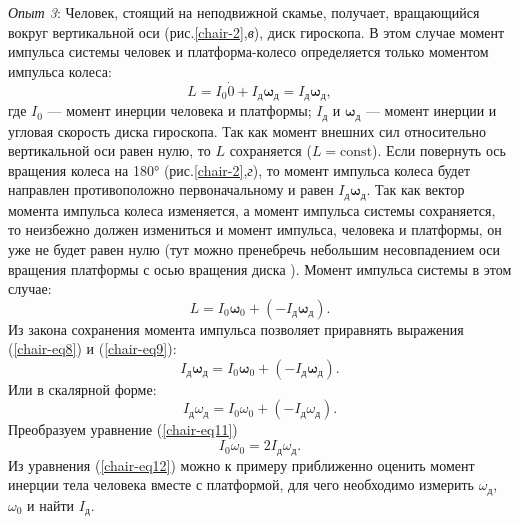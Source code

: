 \documentclass[All.tex]{subfiles}
\begin{document}
\textit{Опыт 3}:
Человек, стоящий на неподвижной скамье, получает, вращающийся вокруг вертикальной оси (рис.\ref{chair-2},\textit{в}), диск гироскопа. 
В этом случае момент импульса системы человек и платформа-колесо определяется только моментом импульса колеса:
\begin{equation}\label{chair-eq8}
L = I_{0} \dot 0 + I_{\text{д}}\bm{\omega}_{\text{д}} = I_{\text{д}}\bm{\omega}_{\text{д}},
\end{equation}
где $ I_{0} $ — момент инерции человека и платформы; $ I_{\text{д}} $ и $ \bm{\omega}_{\text{д}} $ — момент инерции и угловая скорость диска гироскопа.
Так как момент внешних сил относительно вертикальной оси равен нулю, то $ L $ сохраняется ($ L = \text{const} $).
Если повернуть ось вращения колеса на 180° (рис.\ref{chair-2},\textit{г}), то момент импульса колеса будет направлен противоположно первоначальному и равен $ I_{\text{д}}\bm{\omega}_{\text{д}} $.
Так как вектор момента импульса колеса изменяется, а момент импульса системы сохраняется, то неизбежно должен измениться и момент импульса, человека и платформы, он уже не будет равен нулю (тут можно пренебречь небольшим несовпадением оси вращения платформы с осью вращения диска ).
Момент импульса системы в этом случае:
\begin{equation}\label{chair-eq9}
L = I_{0}\bm{\omega}_{0} + (- I_{\text{д}}\bm{\omega}_{\text{д}}).
\end{equation}
Из закона сохранения момента импульса позволяет приравнять выражения (\ref{chair-eq8}) и (\ref{chair-eq9}):
\begin{equation}\label{chair-eq10}
I_{\text{д}}\bm{\omega}_{\text{д}} = I_{0}\bm{\omega}_{0} + (- I_{\text{д}}\bm{\omega}_{\text{д}}).
\end{equation}
Или в скалярной форме:
\begin{equation}\label{chair-eq11}
I_{\text{д}}\omega_{\text{д}} = I_{0}\omega_{0} + (- I_{\text{д}}\omega_{\text{д}}).
\end{equation}
Преобразуем уравнение (\ref{chair-eq11})
\begin{equation}\label{chair-eq12}
I_{0}\omega_{0} =  2I_{\text{д}}\omega_{\text{д}}.
\end{equation}
Из уравнения (\ref{chair-eq12}) можно к примеру приближенно оценить момент инерции тела человека вместе с платформой, для чего необходимо измерить $ \omega_{\text{д}} $, $ \omega_{0} $ и найти $ I_{\text{д}} $.
\end{document}
